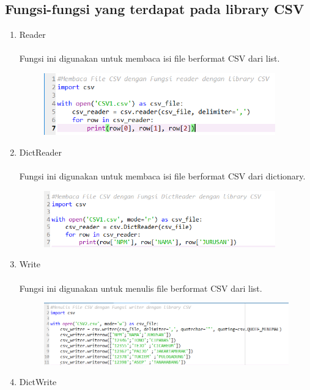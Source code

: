 \documentclass[a4paper, 12pt]{article}
\begin{document}
\subsection{Fungsi-fungsi yang terdapat pada library CSV}
\begin{enumerate}
\item Reader
\paragraph{} Fungsi ini digunakan untuk membaca isi file berformat CSV dari list.
\newpage\begin{figure}[ht]
\centerline{\includegraphics[width=10cm]{figure/1.PNG}}
\end{figure}
\item DictReader
\paragraph{}  Fungsi ini digunakan untuk membaca isi file berformat CSV dari dictionary.
\begin{figure}[ht]
\centerline{\includegraphics[width=10cm]{figure/2.PNG}}
\end{figure}
\item Write
\paragraph{} Fungsi ini digunakan untuk menulis file berformat CSV dari list.
\begin{figure}[ht]
\centerline{\includegraphics[width=15cm]{figure/3.PNG}}
\end{figure}
\newpage\item DictWrite

\end{enumerate}
\end{document}
